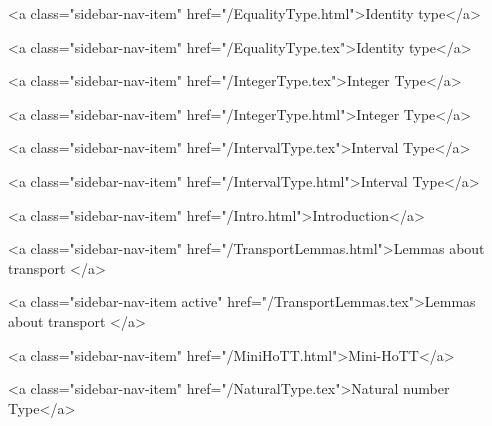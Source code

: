       
        
          <a class="sidebar-nav-item" href="/EqualityType.html">Identity type</a>
        
      
    
      
        
          <a class="sidebar-nav-item" href="/EqualityType.tex">Identity type</a>
        
      
    
      
        
          <a class="sidebar-nav-item" href="/IntegerType.tex">Integer Type</a>
        
      
    
      
        
          <a class="sidebar-nav-item" href="/IntegerType.html">Integer Type</a>
        
      
    
      
        
          <a class="sidebar-nav-item" href="/IntervalType.tex">Interval Type</a>
        
      
    
      
        
          <a class="sidebar-nav-item" href="/IntervalType.html">Interval Type</a>
        
      
    
      
        
          <a class="sidebar-nav-item" href="/Intro.html">Introduction</a>
        
      
    
      
        
          <a class="sidebar-nav-item" href="/TransportLemmas.html">Lemmas about transport </a>
        
      
    
      
        
          <a class="sidebar-nav-item active" href="/TransportLemmas.tex">Lemmas about transport </a>
        
      
    
      
        
          <a class="sidebar-nav-item" href="/MiniHoTT.html">Mini-HoTT</a>
        
      
    
      
        
          <a class="sidebar-nav-item" href="/NaturalType.tex">Natural number Type</a>
        
      
    
